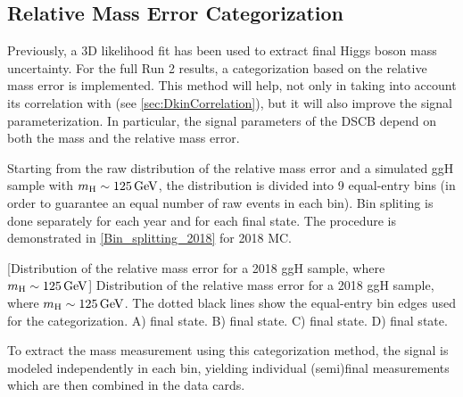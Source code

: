 \subsection{Relative Mass Error Categorization}
\label{sec:SignalParam_N_2D}
Previously, a 3D likelihood fit has been used to extract final Higgs boson mass uncertainty. 
For the full Run 2 results, a categorization based on the relative mass error is implemented.
This method will help, not only in taking into account its correlation with \Dkinbkg (see \ref{sec:DkinCorrelation}), but it will also improve the signal parameterization.
In particular, the signal parameters of the DSCB depend on both the mass and the relative mass error.

Starting from the raw distribution of the relative mass error and a simulated ggH sample with $m_{\mathrm{H}} \sim 125\,\text{Ge\hspace{-.08em}V}$, 
the distribution is divided into 9 equal-entry bins (\ie in order to guarantee an equal number of raw events in each bin).
Bin spliting is done separately for each year and for each final state.
The procedure is demonstrated in \cref{Bin_splitting_2018} for 2018 MC.
\begin{multiFigure}
    \centering
        [Distribution of the relative mass error for a 2018 ggH sample, where $m_{\mathrm{H}} \sim 125\,\text{Ge\hspace{-.08em}V}$]
        {Distribution of the relative mass error for a 2018 ggH sample, where $m_{\mathrm{H}} \sim 125\,\text{Ge\hspace{-.08em}V}$.
        The dotted black lines show the equal-entry bin edges used for the categorization.
        \;A) \fourmu final state.
        \;B) \foure final state.
        \;C) \twoetwomu final state.
        \;D) \twomutwoe final state.}
    \label{Bin_splitting_2018}
\end{multiFigure}

To extract the mass measurement using this categorization method,
the signal is modeled independently in each bin, 
yielding individual (semi)final measurements which are then combined in the data cards.

